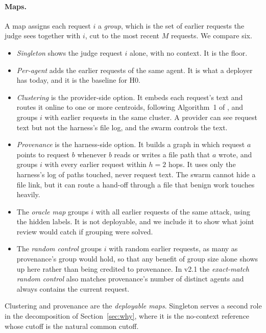 \documentclass[10pt]{article}
\begin{document}
\paragraph{Maps.} A map assigns each request $i$ a \emph{group}, which is the set of earlier requests the judge sees together with $i$, cut to the most recent $M$ requests. We compare six.
\begin{itemize}
\item \emph{Singleton} shows the judge request $i$ alone, with no context. It is the floor.
\item \emph{Per-agent} adds the earlier requests of the same agent. It is what a deployer has today, and it is the baseline for H0.
\item \emph{Clustering} is the provider-side option. It embeds each request's text and routes it online to one or more centroids, following Algorithm~1 of \citet{brown2026}, and groups $i$ with earlier requests in the same cluster. A provider can see request text but not the harness's file log, and the swarm controls the text.
\item \emph{Provenance} is the harness-side option. It builds a graph in which request $a$ points to request $b$ whenever $b$ reads or writes a file path that $a$ wrote, and groups $i$ with every earlier request within $h=2$ hops. It uses only the harness's log of paths touched, never request text. The swarm cannot hide a file link, but it can route a hand-off through a file that benign work touches heavily.
\item The \emph{oracle map} groups $i$ with all earlier requests of the same attack, using the hidden labels. It is not deployable, and we include it to show what joint review would catch if grouping were solved.
\item The \emph{random control} groups $i$ with random earlier requests, as many as provenance's group would hold, so that any benefit of group size alone shows up here rather than being credited to provenance. In v2.1 the \emph{exact-match random control} also matches provenance's number of distinct agents and always contains the current request.
\end{itemize}
Clustering and provenance are the \emph{deployable maps}. Singleton serves a second role in the decomposition of Section~\ref{sec:why}, where it is the no-context reference whose cutoff is the natural common cutoff.
\end{document}
